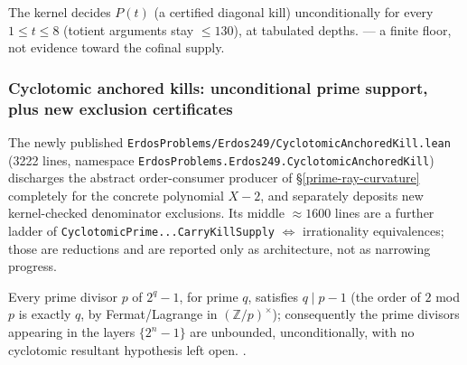 \begin{obs}
The kernel decides $P(t)$ (a certified diagonal kill) unconditionally for
every $1\le t\le 8$ (totient arguments stay $\le 130$), at tabulated depths.
\quad {}
\quad {} \quad {} \quad {} --- a
finite floor, not evidence toward the cofinal supply.
\end{obs}

\subsubsection{Cyclotomic anchored kills: unconditional prime support, plus new exclusion certificates}

The newly published \texttt{ErdosProblems/Erdos249/CyclotomicAnchoredKill.lean}
(3222 lines, namespace \texttt{ErdosProblems.Erdos249.CyclotomicAnchoredKill})
discharges the abstract order-consumer producer of
\S\ref{prime-ray-curvature} completely for the concrete polynomial $X-2$, and
separately deposits new kernel-checked denominator exclusions. Its middle
$\approx\!1600$ lines are a further ladder of
\texttt{CyclotomicPrime...CarryKillSupply} $\Leftrightarrow$ irrationality
equivalences; those are reductions and are reported only as architecture,
not as narrowing progress.

\begin{thm}
Every prime divisor $p$ of $2^q-1$, for prime $q$, satisfies $q\mid p-1$
(the order of $2$ mod $p$ is exactly $q$, by Fermat/Lagrange in
$(\mathbb{Z}/p)^\times$); consequently the prime divisors appearing in the
layers $\{2^n-1\}$ are unbounded, unconditionally, with no cyclotomic
resultant hypothesis left open.
\quad {}
\quad {} \quad {} \quad {}.
\end{thm}

